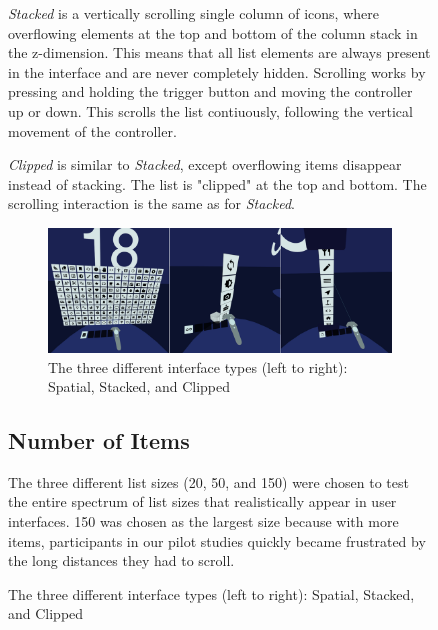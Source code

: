 \documentclass{tufte-book} %
\begin{document}
\begin{figure}
\emph{Stacked} is a vertically scrolling single column of icons, where overflowing elements at the top and bottom of the column stack in the z-dimension. This means that all list elements are always present in the interface and are never completely hidden. Scrolling works by pressing and holding the trigger button and moving the controller up or down. This scrolls the list contiuously, following the vertical movement of the controller.

\emph{Clipped} is similar to \emph{Stacked}, except overflowing items disappear instead of stacking. The list is "clipped" at the top and bottom. The scrolling interaction is the same as for \emph{Stacked}.

\begin{figure}[h]
\includegraphics[width=\linewidth]{interface-types.png}
\caption{The three different interface types (left to right): Spatial, Stacked, and Clipped}
\label{fig:interface-types}
\end{figure}


\subsection{Number of Items}

The three different list sizes (20, 50, and 150) were chosen to test the entire spectrum of list sizes that realistically appear in user interfaces. 150 was chosen as the largest size because with more items, participants in our pilot studies quickly became frustrated by the long distances they had to scroll.


\end{figure}
\end{document}
